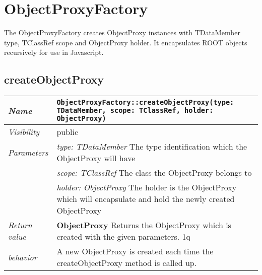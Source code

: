 \chapter{ObjectProxyFactory}
The ObjectProxyFactory creates ObjectProxy instances with TDataMember type, TClassRef scope and ObjectProxy holder. It encapsulates ROOT objects recursively for use in Javascript. 
\section{createObjectProxy}
\begin{longtable}{p{3cm} @{\hskip 1cm} p{12cm}}
 \hline
\textit{Name} & \texttt{ObjectProxyFactory::createObjectProxy(type: TDataMember, scope: TClassRef, holder: ObjectProxy)}\\
\hline
 \textit{Visibility} & public\\
\hline
\textit{Parameters} & \textit{type: TDataMember} The type identification which the ObjectProxy will have \\
& \textit{scope: TClassRef} The class the ObjectProxy belongs to \\
& \textit{holder: ObjectProxy}  The holder is the ObjectProxy which will encapsulate and hold the newly created ObjectProxy \\
\hline
\textit{Return value} & \textbf{ ObjectProxy} Returns the ObjectProxy which is created with the given parameters. 1q\\
  \hline
 \textit{behavior} & A new ObjectProxy is created each time the createObjectProxy method is called up. \\
\hline
\end{longtable} \pagebreak
 